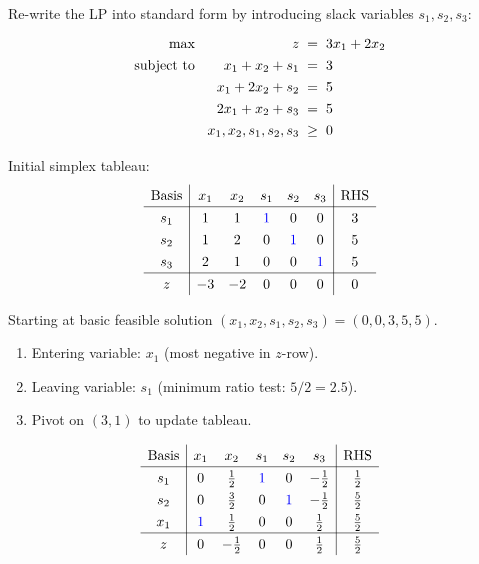 \documentclass[a4paper, 10pt]{article}
\begin{document}
\begin{solution}
Re-write the LP into standard form by introducing slack variables \(s_1, s_2, s_3\):
\[
\begin{array}{@{\hspace{2mm}} r @{\hspace{2mm}} r @{\hspace{2mm}} c @{\hspace{2mm}} l}
    \text{max } & z & = & 3x_1 + 2x_2 \\
    \text{subject to } & x_1 + x_2 + s_1 & = & 3 \\
    & x_1 + 2x_2 + s_2 & = & 5 \\
    & 2x_1 + x_2 + s_3 & = & 5 \\
    & x_1, x_2, s_1, s_2, s_3 & \geq & 0
\end{array}
\]

Initial simplex tableau:
\[
\begin{array}{c|ccccc|c}
    \text{Basis} & x_1 & x_2 & s_1 & s_2 & s_3 & \text{RHS} \\
    \hline
    s_1 & 1 & 1 & \textcolor[HTML]{0000FF}{1} & 0 & 0 & 3 \\
    s_2 & 1 & 2 & 0 & \textcolor[HTML]{0000FF}{1} & 0 & 5 \\
    s_3 & 2 & 1 & 0 & 0 & \textcolor[HTML]{0000FF}{1} & 5 \\
    \hline
    z & -3 & -2 & 0 & 0 & 0 & 0 \\
\end{array}
\]

Starting at basic feasible solution \( (x_1, x_2, s_1, s_2, s_3) = (0, 0, 3, 5, 5) \).
\begin{enumerate}
    \item Entering variable: \( x_1 \) (most negative in \( z \)-row).
    \item Leaving variable: \( s_1 \) (minimum ratio test: \( 5/2 = 2.5 \)).
    \item Pivot on \( (3,1) \) to update tableau.
\end{enumerate}
\[
\renewcommand{\arraystretch}{1.3}
\begin{array}{c|ccccc|c}
    \text{Basis} & x_1 & x_2 & s_1 & s_2 & s_3 & \text{RHS} \\
    \hline
    s_1 & 0 & \frac{1}{2} & \textcolor[HTML]{0000FF}{1} & 0 & -\frac{1}{2} & \frac{1}{2} \\
    s_2 & 0 & \frac{3}{2} & 0 & \textcolor[HTML]{0000FF}{1} & -\frac{1}{2} & \frac{5}{2} \\
    x_1 & \textcolor[HTML]{0000FF}{1} & \frac{1}{2} & 0 & 0 & \frac{1}{2} & \frac{5}{2} \\
    \hline
    z & 0 & -\frac{1}{2} & 0 & 0 & \frac{1}{2} & \frac{5}{2} \\
\end{array}
\]


\end{solution}
\end{document}
